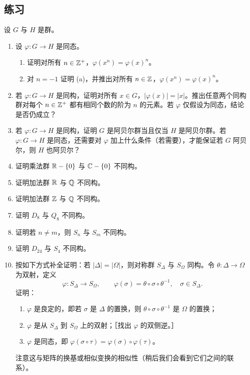 \subsection*{练习}
设 $G$ 与 $H$ 是群。
\begin{enumerate}[label=\arabic*.]
  \item 设 $\varphi:G\to H$ 是同态。
  \begin{enumerate}[label=(\alph*)]
    \item 证明对所有 $n\in\mathbb{Z}^+$，$\varphi(x^n)=\varphi(x)^n$。
    \item 对 $n=-1$ 证明 (a)，并推出对所有 $n\in\mathbb{Z}$，$\varphi(x^n)=\varphi(x)^n$。
  \end{enumerate}
  \item 若 $\varphi:G\to H$ 是同构，证明对所有 $x\in G$，$|\varphi(x)|=|x|$。推出任意两个同构群对每个 $n\in\mathbb{Z}^+$ 都有相同个数的阶为 $n$ 的元素。若 $\varphi$ 仅假设为同态，结论是否仍成立？
  \item 若 $\varphi:G\to H$ 是同构，证明 $G$ 是阿贝尔群当且仅当 $H$ 是阿贝尔群。若 $\varphi:G\to H$ 是同态，还需要对 $\varphi$ 加上什么条件（若需要），才能保证若 $G$ 阿贝尔，则 $H$ 也阿贝尔？
  \item 证明乘法群 $\mathbb{R}-\{0\}$ 与 $\mathbb{C}-\{0\}$ 不同构。
  \item 证明加法群 $\mathbb{R}$ 与 $\mathbb{Q}$ 不同构。
  \item 证明加法群 $\mathbb{Z}$ 与 $\mathbb{Q}$ 不同构。
  \item 证明 $D_8$ 与 $Q_8$ 不同构。
  \item 证明若 $n\neq m$，则 $S_n$ 与 $S_m$ 不同构。
  \item 证明 $D_{24}$ 与 $S_4$ 不同构。
  \item 按如下方式补全证明：若 $|\Delta|=|\Omega|$，则对称群 $S_\Delta$ 与 $S_\Omega$ 同构。令 $\theta:\Delta\to\Omega$ 为双射，定义
  \[
    \varphi:S_\Delta\to S_\Omega,
    \qquad \varphi(\sigma)=\theta\circ\sigma\circ\theta^{-1},
    \quad \sigma\in S_\Delta.
  \]
  证明：
  \begin{enumerate}[label=(\alph*)]
    \item $\varphi$ 是良定的，即若 $\sigma$ 是 $\Delta$ 的置换，则 $\theta\circ\sigma\circ\theta^{-1}$ 是 $\Omega$ 的置换；
    \item $\varphi$ 是从 $S_\Delta$ 到 $S_\Omega$ 上的双射；［找出 $\varphi$ 的双侧逆。］
    \item $\varphi$ 是同态，即 $\varphi(\sigma\circ\tau)=\varphi(\sigma)\circ\varphi(\tau)$。
  \end{enumerate}
  注意这与矩阵的换基或相似变换的相似性（稍后我们会看到它们之间的联系）。

\end{enumerate}
